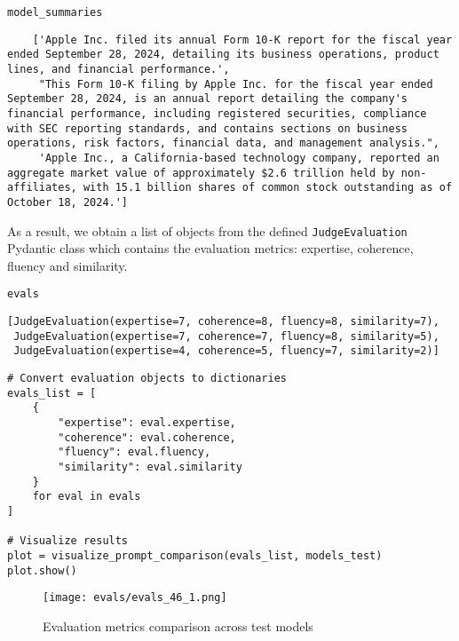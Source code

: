 \begin{verbatim}
model_summaries
\end{verbatim}



    \begin{verbatim}
    ['Apple Inc. filed its annual Form 10-K report for the fiscal year ended September 28, 2024, detailing its business operations, product lines, and financial performance.',
     "This Form 10-K filing by Apple Inc. for the fiscal year ended September 28, 2024, is an annual report detailing the company's financial performance, including registered securities, compliance with SEC reporting standards, and contains sections on business operations, risk factors, financial data, and management analysis.",
     'Apple Inc., a California-based technology company, reported an aggregate market value of approximately $2.6 trillion held by non-affiliates, with 15.1 billion shares of common stock outstanding as of October 18, 2024.']
    \end{verbatim}


As a result, we obtain a list of objects from the defined \texttt{JudgeEvaluation} Pydantic class which contains the evaluation metrics: expertise, coherence, fluency and similarity.

\begin{verbatim}
evals
\end{verbatim}

\begin{verbatim}
[JudgeEvaluation(expertise=7, coherence=8, fluency=8, similarity=7),
 JudgeEvaluation(expertise=7, coherence=7, fluency=8, similarity=5),
 JudgeEvaluation(expertise=4, coherence=5, fluency=7, similarity=2)]
\end{verbatim}


\begin{verbatim}
# Convert evaluation objects to dictionaries
evals_list = [
    {
        "expertise": eval.expertise,
        "coherence": eval.coherence, 
        "fluency": eval.fluency,
        "similarity": eval.similarity
    }
    for eval in evals
]

# Visualize results
plot = visualize_prompt_comparison(evals_list, models_test)
plot.show()
\end{verbatim}



\begin{figure}[h]
\centering
\texttt{[image: evals/evals\_46\_1.png]}
\caption{Evaluation metrics comparison across test models}
\label{fig:eval-comparison}
\end{figure}

